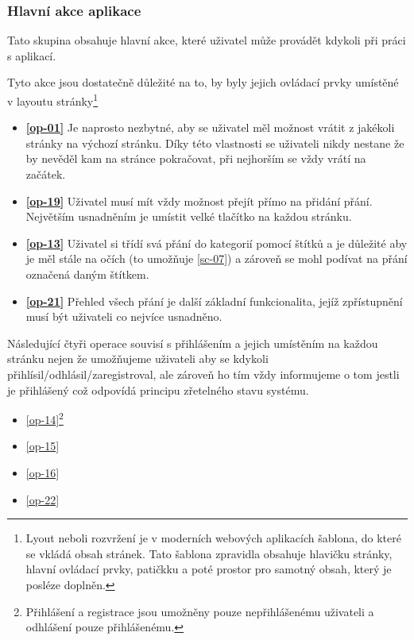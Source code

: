 \subsubsection{Hlavní akce aplikace}
\label{sec:hlavni-akce}
Tato skupina obsahuje hlavní akce, které uživatel může provádět kdykoli při práci s aplikací.

Tyto akce jsou dostatečně důležité na to, by byly jejich ovládací prvky umístěné v layoutu stránky\footnote{Lyout neboli rozvržení je v moderních webových aplikacích šablona, do které se vkládá obsah stránek. Tato šablona zpravidla obsahuje hlavičku stránky, hlavní ovládací prvky, patičkku a poté prostor pro samotný obsah, který je posléze doplněn.}
\begin{itemize}
\item \textbf{\ref{op-01}} Je naprosto nezbytné, aby se uživatel měl možnost vrátit z jakékoli stránky na výchozí stránku\cite{molich1990improving}. Díky této vlastnosti se uživateli nikdy nestane že by nevěděl kam na stránce pokračovat, při nejhorším se vždy vrátí na začátek.
\item \textbf{\ref{op-19}} Uživatel musí mít vždy možnost přejít přímo na přidání přání. Největším usnadněním je umístit velké tlačítko na každou stránku.
\item \textbf{\ref{op-13}} Uživatel si třídí svá přání do kategorií pomocí štítků a je důležité aby je měl stále na očích (to umožňuje \ref{sc-07}) a zároveň se mohl podívat na přání označená daným štítkem.
\item \textbf{\ref{op-21}} Přehled všech přání je další základní funkcionalita, jejíž zpřístupnění musí být uživateli co nejvíce usnadněno.
\end{itemize}
Následující čtyři operace souvisí s přihlášením a jejich umístěním na každou stránku nejen že umožňujeme uživateli aby se kdykoli přihlísil/odhlásil/zaregistroval, ale zároveň ho tím vždy informujeme o tom jestli je přihlášený což odpovídá principu zřetelného stavu systému\cite{molich1990improving}.
\begin{multicols}{2}
\begin{itemize}
\item \ref{op-14}\footnote{Přihlášení a registrace jsou umožněny pouze nepřihlášenému uživateli a odhlášení pouze přihlášenému.\label{footnote-login}}
\item \ref{op-15}
\item \ref{op-16}
\item \ref{op-22}
\end{itemize}
\end{multicols}

